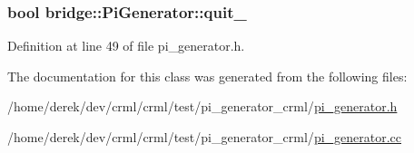 \hypertarget{classbridge_1_1_pi_generator_a682f8e27a788cb81f1b862b02e6ab127}{
\subsubsection[{quit\_\-}]{\setlength{\rightskip}{0pt plus 5cm}bool {\bf bridge::PiGenerator::quit\_\-}}}
\label{classbridge_1_1_pi_generator_a682f8e27a788cb81f1b862b02e6ab127}


Definition at line 49 of file pi\_\-generator.h.



The documentation for this class was generated from the following files:\begin{DoxyCompactItemize}
\item 
/home/derek/dev/crml/crml/test/pi\_\-generator\_\-crml/\hyperlink{pi__generator__crml_2pi__generator_8h}{pi\_\-generator.h}\item 
/home/derek/dev/crml/crml/test/pi\_\-generator\_\-crml/\hyperlink{pi__generator__crml_2pi__generator_8cc}{pi\_\-generator.cc}\end{DoxyCompactItemize}
